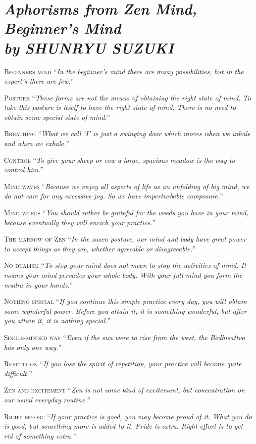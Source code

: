 \documentclass[14pt]{extarticle}
\newcommand{\aphor}[3]{
    \lettrine[lines=2, lraise=0.15]{#1}{#2}
    \enquote{\textit{#3}}
}
\begin{document}
\section*{\LARGE\sffamily\slshape Aphorisms from Zen Mind, Beginner's Mind \\ {\large by SHUNRYU SUZUKI }}
\aphor{B}{eginners mind} {In the beginner's mind there are many possibilities, but in the expert's there are few.}

\aphor{P}{osture} {These forms are not the means of obtaining the right state of mind. To take this posture is itself to have the right state of mind. There is no need to obtain some special state of mind.}

\aphor{B}{reathing} {What we call \enquote{I} is just a swinging door which moves when we inhale and when we exhale.}

\aphor{C}{ontrol} {To give your sheep or cow a large, spacious meadow is the way to control him.}

\aphor{M}{ind waves} {Because we enjoy all aspects of life as an unfolding of big mind, we do not care for any excessive joy. So we have imperturbable composure.}

\aphor{M}{ind weeds} {You should rather be grateful for the weeds you have in your mind, because eventually they will enrich your practice.}


\aphor{T}{he marrow of Zen} {In the zazen posture, our mind and body have great power to accept things as they are, whether agreeable or disagreeable.}


\aphor{N}{o dualism} {To stop your mind does not mean to stop the activities of mind. It means your mind pervades your whole body. With your full mind you form the mudra in your hands.}

\pagebreak

\aphor{N}{othing special} {If you continue this simple practice every day, you will obtain some wonderful power. Before you attain it, it is something wonderful, but after you attain it, it is nothing special.}

\aphor{S}{ingle-minded way} {Even if the sun were to rise from the west, the Bodhisattva has only one way.}

\aphor{R}{epetition} {If you lose the spirit of repetition, your practice will become quite difficult.}

\aphor{Z}{en and excitement} {Zen is not some kind of excitement, but concentration on our usual everyday routine.}

\aphor{R}{ight effort} {If your practice is good, you may become proud of it. What you do is good, but something more is added to it. Pride is extra. Right effort is to get rid of something extra.}
\end{document}
